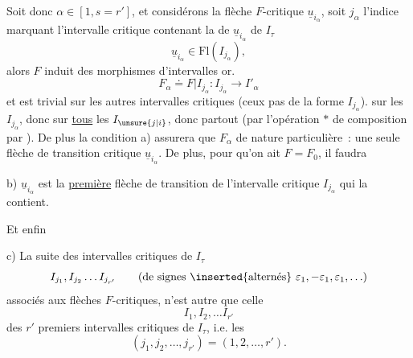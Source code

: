  Soit donc $\alpha\in[1,s=r']$, et considérons la flèche  $F$-critique $\underline{u}_{i_\alpha}$, soit $j_\alpha$ l'indice marquant l'intervalle critique  contenant la  de $\underline{u}_{i_\alpha}$ de $I_\tau$
\[
\underline{u}_{i_\alpha}\in\mathrm{Fl}(I_{j_\alpha}),
\]
alors $F$ induit des morphismes  d'intervalles or.
\[
F_\alpha\doteq F|I_{j_\alpha}:I_{j_\alpha}\longrightarrow I'_\alpha
\]
et est trivial sur les autres intervalles critiques (ceux pas de la forme $I_{j_\alpha}$).    sur les $I_{j_\alpha}$, donc sur \uline{tous} les $I_{\unsure{j|i}}$, donc partout (par l'opération $*$ \deleted{\unsure{$\}$}} de composition par ). De plus  la condition a)
assurera que   $F_\alpha$  de nature  particulière~: une seule flèche de transition critique $\underline{u}_{i_\alpha}$. De plus, pour qu'on ait $F=F_0$, il faudra

b)  \inserted{$\forall\alpha\in[1,r']$} $\underline{u}_{i_\alpha}$ est la \uline{première} flèche de transition de l'intervalle critique $I_{j_\alpha}$ qui la contient.

Et enfin

c) La suite des intervalles critiques  de $I_\tau$
\[
I_{j_1},I_{j_2}\ldots I_{j_{r'}}\qquad(\text{de signes }\inserted{\text{alternés}}\ \varepsilon_1,-\varepsilon_1,\varepsilon_1,\ldots)
\]
associés aux flèches $F$-critiques, n'est autre que celle 
\[
I_1,I_2,\ldots I_{r'}
\]
des $r'$ premiers intervalles critiques de $I_\tau$, i.e. les
\[
(j_1,j_2,\ldots,j_{r'})=(1,2,\ldots,r').
\]
